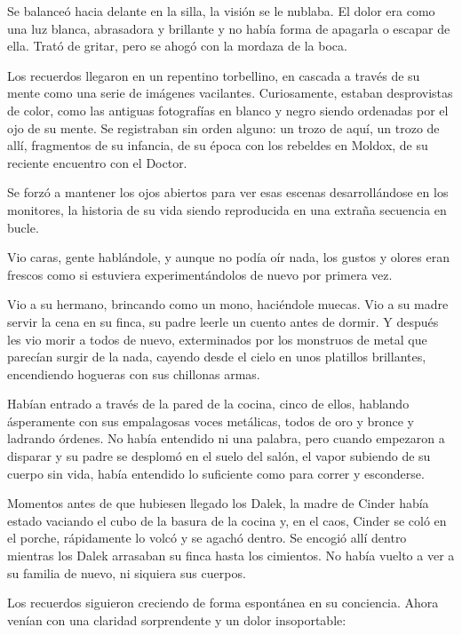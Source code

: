 Se balanceó hacia delante en la silla, la visión se le nublaba. El dolor era como una luz blanca, abrasadora y brillante y no había forma de apagarla o escapar de ella. Trató de gritar, pero se ahogó con la mordaza de la boca. 

Los recuerdos llegaron en un repentino torbellino, en cascada a través de su mente como una serie de imágenes vacilantes. Curiosamente, estaban desprovistas de color, como las antiguas fotografías en blanco y negro siendo ordenadas por el ojo de su mente. Se registraban sin orden alguno: un trozo de aquí, un trozo de allí, fragmentos de su infancia, de su época con los rebeldes en Moldox, de su reciente encuentro con el Doctor. 

Se forzó a mantener los ojos abiertos para ver esas escenas desarrollándose en los monitores, la historia de su vida siendo reproducida en una extraña secuencia en bucle. 

Vio caras, gente hablándole, y aunque no podía oír nada, los gustos y olores eran frescos como si estuviera experimentándolos de nuevo por primera vez. 

Vio a su hermano, brincando como un mono, haciéndole muecas. Vio a su madre servir la cena en su finca, su padre leerle un cuento antes de dormir. Y después les vio morir a todos de nuevo, exterminados por los monstruos de metal que parecían surgir de la nada, cayendo desde el cielo en unos platillos brillantes, encendiendo hogueras con sus chillonas armas. 

Habían entrado a través de la pared de la cocina, cinco de ellos, hablando ásperamente con sus empalagosas voces metálicas, todos de oro y bronce y ladrando órdenes. No había entendido ni una palabra, pero cuando empezaron a disparar y su padre se desplomó en el suelo del salón, el vapor subiendo de su cuerpo sin vida, había entendido lo suficiente como para correr y esconderse. 

Momentos antes de que hubiesen llegado los Dalek, la madre de Cinder había estado vaciando el cubo de la basura de la cocina y, en el caos, Cinder se coló en el porche, rápidamente lo volcó y se agachó dentro. Se encogió allí dentro mientras los Dalek arrasaban su finca hasta los cimientos. No había vuelto a ver a su familia de nuevo, ni siquiera sus cuerpos. 

Los recuerdos siguieron creciendo de forma espontánea en su conciencia. Ahora venían con una claridad sorprendente y un dolor insoportable: 



